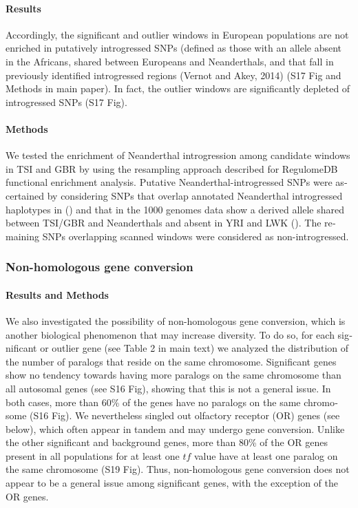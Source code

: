 \begin{refsection}
\begin{otherlanguage}{english}
\begin{footnotesize}
\paragraph{Results} Accordingly, the significant and outlier windows in European populations are not enriched in putatively introgressed SNPs (defined as those with an allele absent in the Africans, shared between Europeans and Neanderthals, and that fall in previously identified introgressed regions (Vernot and Akey, 2014) (S17 Fig and Methods in main paper). In fact, the outlier windows are significantly depleted of introgressed SNPs (S17 Fig). 

\paragraph{Methods} We tested the enrichment of Neanderthal introgression among candidate windows in TSI and GBR by using the resampling approach described for RegulomeDB functional enrichment analysis. Putative Neanderthal-introgressed SNPs were ascertained by considering SNPs that overlap annotated Neanderthal introgressed haplotypes in (\cite{Vernot2014}) and that in the 1000 genomes data show a derived allele shared between TSI/GBR and Neanderthals and absent in YRI and LWK (\cite{Abecasis2012}). The remaining SNPs overlapping scanned windows were considered as non-introgressed.

\subsubsection{Non-homologous gene conversion}

\paragraph{Results and Methods} We also investigated the possibility of non-homologous gene conversion, which is another biological phenomenon that may increase diversity. To do so, for each significant or outlier gene (see Table 2 in main text) we analyzed the distribution of the number of paralogs that reside on the same chromosome. Significant genes show no tendency towards having more paralogs on the same chromosome than all autosomal genes (see S16 Fig), showing that this is not a general issue. In both cases, more than 60\% of the genes have no paralogs on the same chromosome (S16 Fig). 
We nevertheless singled out olfactory receptor (OR) genes (see below), which often appear in tandem and may undergo gene conversion. Unlike the other significant and background genes, more than 80\% of the OR genes present in all populations for at least one $tf$ value have at least one paralog on the same chromosome (S19 Fig). Thus, non-homologous gene conversion does not appear to be a general issue among significant genes, with the exception of the OR genes. 


\end{footnotesize}
\end{otherlanguage}
\end{refsection}
